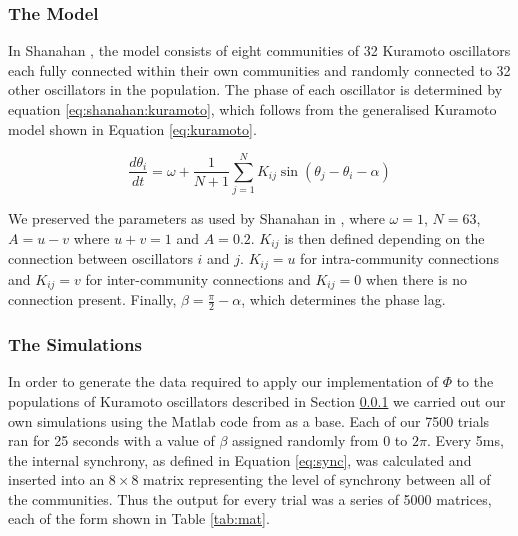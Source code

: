 \documentclass[a4paper,11pt]{article}
\begin{document}
\subsubsection{The Model}
\label{sec:osc:mod}

In Shanahan \cite{Shanahan2010}, the model consists of eight communities of 32 Kuramoto oscillators each fully connected within their own communities and randomly connected to 32 other oscillators in the population. The phase of each oscillator is determined by equation \ref{eq:shanahan:kuramoto}, which follows from the generalised Kuramoto model shown in Equation \ref{eq:kuramoto}. 

\begin{equation} \label{eq:shanahan:kuramoto}
\frac{d\theta_i}{dt} = \omega + \frac{1}{N + 1} \sum_{j=1}^{N} K_{ij} \sin(\theta_j - \theta_i - \alpha)
\end{equation}

We preserved the parameters as used by Shanahan in \cite{Shanahan2010}, where $\omega = 1$, $N = 63$, $A = u - v$ where $u + v = 1$ and $A = 0.2$. $K_{ij}$ is then defined depending on the connection between oscillators $i$ and $j$. $K_{ij} = u$ for intra-community connections and $K_{ij} = v$ for inter-community connections and $K_{ij} = 0$ when there is no connection present. Finally, $\beta = \frac{\pi}{2} - \alpha$, which determines the phase lag.

\subsubsection{The Simulations}
\label{sec:osc:sims}

In order to generate the data required to apply our implementation of $\Phi$ to the populations of Kuramoto oscillators described in Section \ref{sec:osc:mod} we carried out our own simulations using the Matlab code from \cite{Shanahan2010} as a base. Each of our 7500 trials ran for 25 seconds with a value of $\beta$ assigned randomly from $0$ to $2\pi$. Every 5ms, the internal synchrony, as defined in Equation \ref{eq:sync}, was calculated and inserted into an $8 \times 8$ matrix representing the level of synchrony between all of the communities. Thus the output for every trial was a series of 5000 matrices, each of the form shown in Table \ref{tab:mat}.
\end{document}
